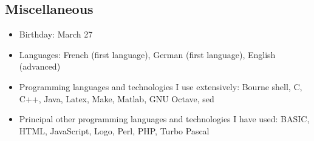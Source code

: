 \documentclass[line,margin]{res}
\newcounter{x}
\begin{document}
\begin{resume}
\section{Miscellaneous}
\begin{itemize}
  \item Birthday:  March 27
  \item Languages: French (first language), German (first language),
    English (advanced)
  \item Programming languages and technologies I use extensively:
    Bourne shell, C, C++, Java, Latex, Make, Matlab, GNU Octave, sed
  \item Principal other programming languages and technologies I have used:
    BASIC, HTML, JavaScript, Logo, Perl, PHP, Turbo Pascal 
\end{itemize}

\end{resume}
\end{document}
